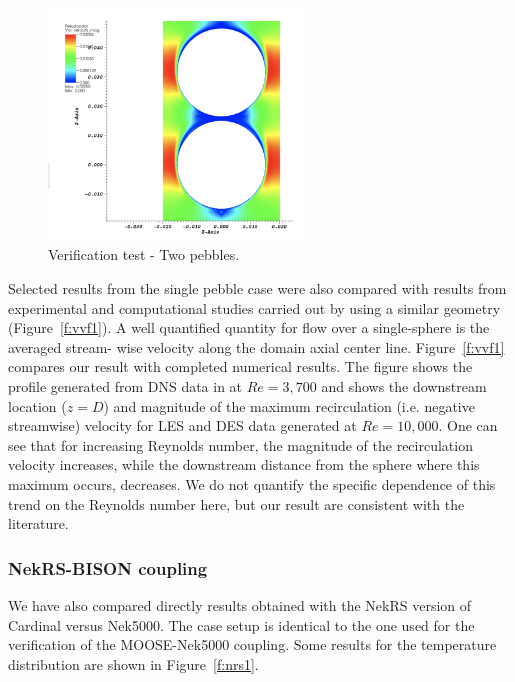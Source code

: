 \begin{figure}[!h]
\centering
\includegraphics[clip=true,width=0.6\textwidth]{Figures/pb_vv2}
\caption{Verification test - Two pebbles.}
\label{f:vvf2}
\end{figure}

Selected results from the single pebble case were also compared with results from experimental and computational studies carried out by using a similar geometry (Figure~\ref{f:vvf1}). A well quantified quantity for flow over a single-sphere is the averaged stream- wise velocity along the domain axial center line. Figure~\ref{f:vvf1} compares our result with completed numerical results. The figure shows the profile generated from DNS data in \cite{fick2017investigation} at $Re = 3,700$ and shows the downstream location ($z=D$) and magnitude of the maximum recirculation (i.e. negative streamwise) velocity for LES and DES data generated at $Re = 10,000$. One can see that for increasing Reynolds number, the magnitude of the recirculation velocity increases, while the downstream distance from the sphere where this maximum occurs, decreases. We do not quantify the specific dependence of this trend on the Reynolds number here, but our result are consistent with the literature.

\subsubsection{NekRS-BISON coupling}

We have also compared directly results obtained with the NekRS version of Cardinal versus Nek5000. The case setup is identical to the one used for the verification of the MOOSE-Nek5000 coupling. Some results for the temperature distribution are shown in Figure~\ref{f:nrs1}.

